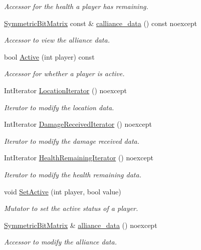 \begin{DoxyCompactItemize}
\begin{DoxyCompactList}\small\item\em Accessor for the health a player has remaining. \end{DoxyCompactList}\item 
\hyperlink{class_symmetric_bit_matrix}{Symmetric\+Bit\+Matrix} const  \& \hyperlink{classroundinfo_1_1_round_info_a0944e6bf6facb52e9955695ea0b3feb3}{calliance\+\_\+data} () const noexcept
\begin{DoxyCompactList}\small\item\em Accessor to view the alliance data. \end{DoxyCompactList}\item 
bool \hyperlink{classroundinfo_1_1_round_info_a03a7ee40677506160aef2766929e6105}{Active} (int player) const
\begin{DoxyCompactList}\small\item\em Accessor for whether a player is active. \end{DoxyCompactList}\item 
Int\+Iterator \hyperlink{classroundinfo_1_1_round_info_ab9e17ca5d68f9981862cbf540cc0b297}{Location\+Iterator} () noexcept
\begin{DoxyCompactList}\small\item\em Iterator to modify the location data. \end{DoxyCompactList}\item 
Int\+Iterator \hyperlink{classroundinfo_1_1_round_info_a94ea1a09ae7680e74188296aef0b0d63}{Damage\+Received\+Iterator} () noexcept
\begin{DoxyCompactList}\small\item\em Iterator to modify the damage received data. \end{DoxyCompactList}\item 
Int\+Iterator \hyperlink{classroundinfo_1_1_round_info_a3a81f2d87bea27339f035201f1887423}{Health\+Remaining\+Iterator} () noexcept
\begin{DoxyCompactList}\small\item\em Iterator to modify the health remaining data. \end{DoxyCompactList}\item 
void \hyperlink{classroundinfo_1_1_round_info_a28d85479753dae18a6b2a27d048d2973}{Set\+Active} (int player, bool value)
\begin{DoxyCompactList}\small\item\em Mutator to set the active status of a player. \end{DoxyCompactList}\item 
\hyperlink{class_symmetric_bit_matrix}{Symmetric\+Bit\+Matrix} \& \hyperlink{classroundinfo_1_1_round_info_a9d5ae58298d3acd11377da7992235762}{alliance\+\_\+data} () noexcept
\begin{DoxyCompactList}\small\item\em Accessor to modify the alliance data. \end{DoxyCompactList}\end{DoxyCompactItemize}
